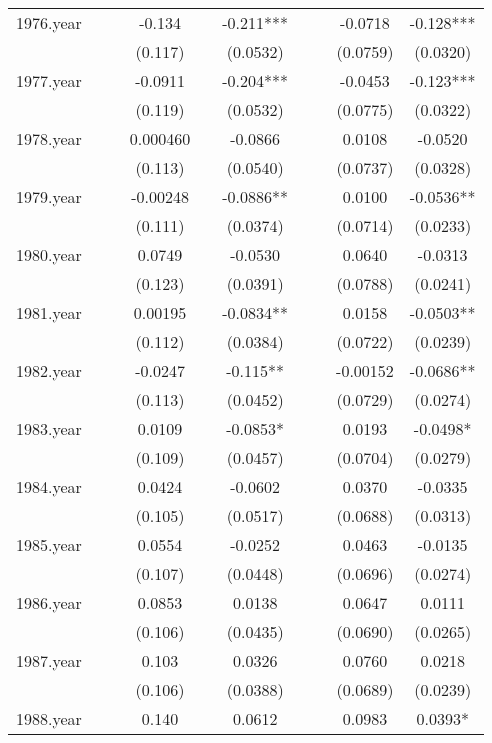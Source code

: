 \documentclass[]{article}
\begin{document}
\begin{tabular}{lccccccccc}
1976.year &  &  & -0.134 &  & -0.211*** &  &  & -0.0718 & -0.128*** \\
 &  &  & (0.117) &  & (0.0532) &  &  & (0.0759) & (0.0320) \\
1977.year &  &  & -0.0911 &  & -0.204*** &  &  & -0.0453 & -0.123*** \\
 &  &  & (0.119) &  & (0.0532) &  &  & (0.0775) & (0.0322) \\
1978.year &  &  & 0.000460 &  & -0.0866 &  &  & 0.0108 & -0.0520 \\
 &  &  & (0.113) &  & (0.0540) &  &  & (0.0737) & (0.0328) \\
1979.year &  &  & -0.00248 &  & -0.0886** &  &  & 0.0100 & -0.0536** \\
 &  &  & (0.111) &  & (0.0374) &  &  & (0.0714) & (0.0233) \\
1980.year &  &  & 0.0749 &  & -0.0530 &  &  & 0.0640 & -0.0313 \\
 &  &  & (0.123) &  & (0.0391) &  &  & (0.0788) & (0.0241) \\
1981.year &  &  & 0.00195 &  & -0.0834** &  &  & 0.0158 & -0.0503** \\
 &  &  & (0.112) &  & (0.0384) &  &  & (0.0722) & (0.0239) \\
1982.year &  &  & -0.0247 &  & -0.115** &  &  & -0.00152 & -0.0686** \\
 &  &  & (0.113) &  & (0.0452) &  &  & (0.0729) & (0.0274) \\
1983.year &  &  & 0.0109 &  & -0.0853* &  &  & 0.0193 & -0.0498* \\
 &  &  & (0.109) &  & (0.0457) &  &  & (0.0704) & (0.0279) \\
1984.year &  &  & 0.0424 &  & -0.0602 &  &  & 0.0370 & -0.0335 \\
 &  &  & (0.105) &  & (0.0517) &  &  & (0.0688) & (0.0313) \\
1985.year &  &  & 0.0554 &  & -0.0252 &  &  & 0.0463 & -0.0135 \\
 &  &  & (0.107) &  & (0.0448) &  &  & (0.0696) & (0.0274) \\
1986.year &  &  & 0.0853 &  & 0.0138 &  &  & 0.0647 & 0.0111 \\
 &  &  & (0.106) &  & (0.0435) &  &  & (0.0690) & (0.0265) \\
1987.year &  &  & 0.103 &  & 0.0326 &  &  & 0.0760 & 0.0218 \\
 &  &  & (0.106) &  & (0.0388) &  &  & (0.0689) & (0.0239) \\
1988.year &  &  & 0.140 &  & 0.0612 &  &  & 0.0983 & 0.0393* \\

\end{tabular}
\end{document}
